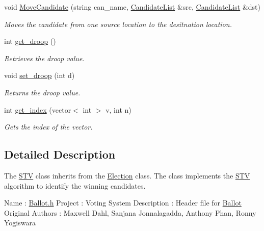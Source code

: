 \begin{DoxyCompactItemize}
void \mbox{\hyperlink{class_s_t_v_ae905b9379a145c034f40428618668d57}{Move\+Candidate}} (string can\+\_\+name, \mbox{\hyperlink{class_candidate_list}{Candidate\+List}} \&src, \mbox{\hyperlink{class_candidate_list}{Candidate\+List}} \&dst)
\begin{DoxyCompactList}\small\item\em Moves the candidate from one source location to the desitnation location. \end{DoxyCompactList}\item 
\mbox{\label{class_s_t_v_a63c8ba4b45b050ead77a884b1a21e534}} 
int \mbox{\hyperlink{class_s_t_v_a63c8ba4b45b050ead77a884b1a21e534}{get\+\_\+droop}} ()
\begin{DoxyCompactList}\small\item\em Retrieves the droop value. \end{DoxyCompactList}\item 
\mbox{\label{class_s_t_v_a3bb1ea48a3d11d9e02ee8d5892557bdd}} 
void \mbox{\hyperlink{class_s_t_v_a3bb1ea48a3d11d9e02ee8d5892557bdd}{set\+\_\+droop}} (int d)
\begin{DoxyCompactList}\small\item\em Returns the droop value. \end{DoxyCompactList}\item 
int \mbox{\hyperlink{class_s_t_v_a28fcd1b404443f9fb1562a4343a44fb9}{get\+\_\+index}} (vector$<$ int $>$ v, int n)
\begin{DoxyCompactList}\small\item\em Gets the index of the vector. \end{DoxyCompactList}\end{DoxyCompactItemize}


\subsection{Detailed Description}
The \mbox{\hyperlink{class_s_t_v}{S\+TV}} class inherits from the \mbox{\hyperlink{class_election}{Election}} class. The class implements the \mbox{\hyperlink{class_s_t_v}{S\+TV}} algorithm to identify the winning candidates. 



 Name \+: \mbox{\hyperlink{_ballot_8h_source}{Ballot.\+h}} Project \+: Voting System Description \+: Header file for \mbox{\hyperlink{class_ballot}{Ballot}} Original Authors \+: Maxwell Dahl, Sanjana Jonnalagadda, Anthony Phan, Ronny Yogiswara



